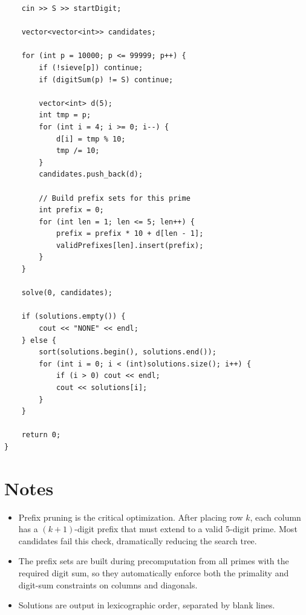 \documentclass[11pt,a4paper]{article}
\begin{document}
\begin{lstlisting}
    cin >> S >> startDigit;

    vector<vector<int>> candidates;

    for (int p = 10000; p <= 99999; p++) {
        if (!sieve[p]) continue;
        if (digitSum(p) != S) continue;

        vector<int> d(5);
        int tmp = p;
        for (int i = 4; i >= 0; i--) {
            d[i] = tmp % 10;
            tmp /= 10;
        }
        candidates.push_back(d);

        // Build prefix sets for this prime
        int prefix = 0;
        for (int len = 1; len <= 5; len++) {
            prefix = prefix * 10 + d[len - 1];
            validPrefixes[len].insert(prefix);
        }
    }

    solve(0, candidates);

    if (solutions.empty()) {
        cout << "NONE" << endl;
    } else {
        sort(solutions.begin(), solutions.end());
        for (int i = 0; i < (int)solutions.size(); i++) {
            if (i > 0) cout << endl;
            cout << solutions[i];
        }
    }

    return 0;
}
\end{lstlisting}

\section{Notes}

\begin{itemize}
  \item Prefix pruning is the critical optimization. After placing row $k$,
    each column has a $(k{+}1)$-digit prefix that must extend to a valid
    5-digit prime. Most candidates fail this check, dramatically reducing
    the search tree.
  \item The prefix sets are built during precomputation from all primes with
    the required digit sum, so they automatically enforce both the primality
    and digit-sum constraints on columns and diagonals.
  \item Solutions are output in lexicographic order, separated by blank
    lines.
\end{itemize}
\end{document}
